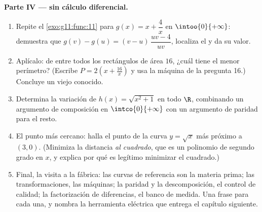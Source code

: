 \begin{problem}
\medskip
\noindent\textbf{Parte IV ---  sin cálculo diferencial.}
\begin{enumerate}[resume]
  \item Repite el \cref{exo:g11:func:11} para $g(x) = x + \dfrac4x$ en
        $\intoo{0}{+\infty}$: demuestra que
        $g(v) - g(u) = (v - u)\,\dfrac{uv - 4}{uv}$, localiza el  y
        da su valor.
  \item Aplícalo: de entre todos los rectángulos de área $16$, ¿cuál tiene
        el menor perímetro? (Escribe
        $P = 2\left(x + \frac{16}{x}\right)$ y usa la máquina de la
        pregunta 16.) Concluye un viejo conocido.
  \item Determina la variación de $h(x) = \sqrt{x^2 + 1}$ en todo $\R$,
        combinando un argumento de composición en $\intco{0}{+\infty}$ con
        un argumento de paridad para el resto.
  \item El punto más cercano: halla el punto de la curva $y = \sqrt x$ más
        próximo a $(3, 0)$. (Minimiza la distancia \emph{al cuadrado}, que
        es un polinomio de segundo grado en $x$, y explica por qué es
        legítimo minimizar el cuadrado.)
  \item Final, la visita a la fábrica: las curvas de referencia son la
        materia prima; las transformaciones, las máquinas; la paridad y la
        descomposición, el control de calidad; la factorización de
        diferencias, el banco de medida. Una frase para cada una, y nombra
        la herramienta eléctrica que entrega el capítulo siguiente.
\end{enumerate}
\end{problem}
